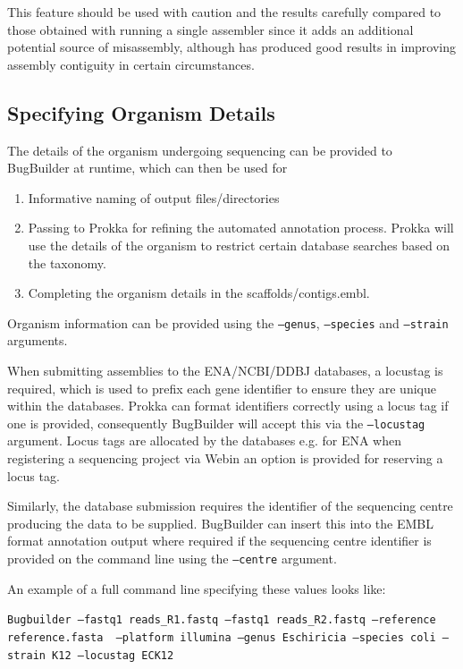 \documentclass[a4paper,10pt]{article}
\begin{document}
\begin{framed}
\danger This feature should be used with caution and the results carefully
compared to those obtained with running a single assembler since it adds an
additional potential source of misassembly, although has produced good results
in improving assembly contiguity in certain circumstances. \danger 
\end{framed}

\subsection{Specifying Organism Details}

The details of the organism undergoing sequencing can be provided to BugBuilder
at runtime, which can then be used for 

\begin{enumerate}
\item Informative naming of output files/directories
\item Passing to Prokka for refining the automated annotation process. Prokka
will use the details of the organism to restrict certain database searches
based on the taxonomy.  \item Completing the organism details in the
scaffolds/contigs.embl.  \end{enumerate}

Organism information can be provided using the {\tt --genus}, {\tt --species}
and {\tt --strain} arguments.

When submitting assemblies to the ENA/NCBI/DDBJ databases, a locustag is
required, which is used to prefix each gene identifier to ensure they are
unique within the databases. Prokka can format identifiers correctly using a
locus tag if one is provided, consequently BugBuilder will accept this via the
{\tt --locustag} argument. Locus tags are allocated by the databases e.g. for
ENA when registering a sequencing project via Webin an option is provided for
reserving a locus tag. 

Similarly, the database submission requires the identifier of the sequencing
centre producing the data to be supplied. BugBuilder can insert this into the
EMBL format annotation output where required if the sequencing centre
identifier is provided on the command line using the {\tt --centre} argument.

An example of a full command line specifying these values looks like:

{\tt Bugbuilder --fastq1 reads\_R1.fastq --fastq1 reads\_R2.fastq --reference reference.fasta \
    --platform illumina --genus Eschiricia --species coli --strain K12 --locustag ECK12

}
\end{document}
